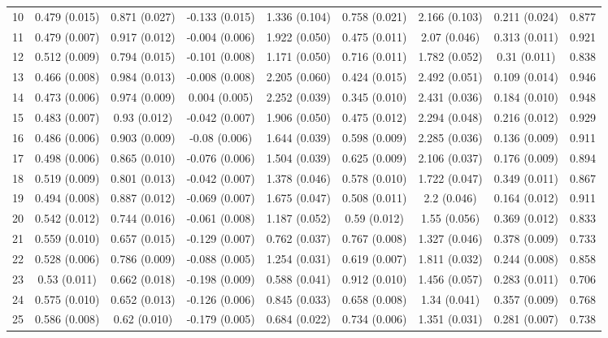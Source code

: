\begin{tabular}{@{\extracolsep{5pt}} l cccccccc}
10 & 0.479 (0.015) & 0.871 (0.027) & -0.133 (0.015) & 1.336 (0.104) & 0.758 (0.021) & 2.166 (0.103) & 0.211 (0.024) & 0.877 \\ 
11 & 0.479 (0.007) & 0.917 (0.012) & -0.004 (0.006) & 1.922 (0.050) & 0.475 (0.011) & 2.07 (0.046) & 0.313 (0.011) & 0.921 \\ 
12 & 0.512 (0.009) & 0.794 (0.015) & -0.101 (0.008) & 1.171 (0.050) & 0.716 (0.011) & 1.782 (0.052) & 0.31 (0.011) & 0.838 \\ 
13 & 0.466 (0.008) & 0.984 (0.013) & -0.008 (0.008) & 2.205 (0.060) & 0.424 (0.015) & 2.492 (0.051) & 0.109 (0.014) & 0.946 \\ 
14 & 0.473 (0.006) & 0.974 (0.009) & 0.004 (0.005) & 2.252 (0.039) & 0.345 (0.010) & 2.431 (0.036) & 0.184 (0.010) & 0.948 \\ 
15 & 0.483 (0.007) & 0.93 (0.012) & -0.042 (0.007) & 1.906 (0.050) & 0.475 (0.012) & 2.294 (0.048) & 0.216 (0.012) & 0.929 \\ 
16 & 0.486 (0.006) & 0.903 (0.009) & -0.08 (0.006) & 1.644 (0.039) & 0.598 (0.009) & 2.285 (0.036) & 0.136 (0.009) & 0.911 \\ 
17 & 0.498 (0.006) & 0.865 (0.010) & -0.076 (0.006) & 1.504 (0.039) & 0.625 (0.009) & 2.106 (0.037) & 0.176 (0.009) & 0.894 \\ 
18 & 0.519 (0.009) & 0.801 (0.013) & -0.042 (0.007) & 1.378 (0.046) & 0.578 (0.010) & 1.722 (0.047) & 0.349 (0.011) & 0.867 \\ 
19 & 0.494 (0.008) & 0.887 (0.012) & -0.069 (0.007) & 1.675 (0.047) & 0.508 (0.011) & 2.2 (0.046) & 0.164 (0.012) & 0.911 \\ 
20 & 0.542 (0.012) & 0.744 (0.016) & -0.061 (0.008) & 1.187 (0.052) & 0.59 (0.012) & 1.55 (0.056) & 0.369 (0.012) & 0.833 \\ 
21 & 0.559 (0.010) & 0.657 (0.015) & -0.129 (0.007) & 0.762 (0.037) & 0.767 (0.008) & 1.327 (0.046) & 0.378 (0.009) & 0.733 \\ 
22 & 0.528 (0.006) & 0.786 (0.009) & -0.088 (0.005) & 1.254 (0.031) & 0.619 (0.007) & 1.811 (0.032) & 0.244 (0.008) & 0.858 \\ 
23 & 0.53 (0.011) & 0.662 (0.018) & -0.198 (0.009) & 0.588 (0.041) & 0.912 (0.010) & 1.456 (0.057) & 0.283 (0.011) & 0.706 \\ 
24 & 0.575 (0.010) & 0.652 (0.013) & -0.126 (0.006) & 0.845 (0.033) & 0.658 (0.008) & 1.34 (0.041) & 0.357 (0.009) & 0.768 \\ 
25 & 0.586 (0.008) & 0.62 (0.010) & -0.179 (0.005) & 0.684 (0.022) & 0.734 (0.006) & 1.351 (0.031) & 0.281 (0.007) & 0.738 \\ 

\end{tabular}
